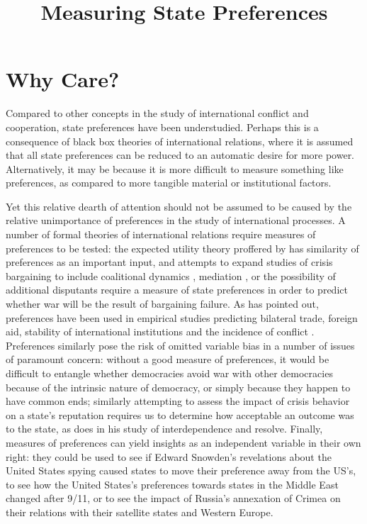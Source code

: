 \documentclass[12pt,onesided,fullpage]{amsart}
\begin{document}
\title{Measuring State Preferences}

\section{Why Care?}
Compared to other concepts in the study of international conflict and cooperation, state preferences have been understudied. Perhaps this is a consequence of black box theories of international relations, where it is assumed that all state preferences can be reduced to an automatic desire for more power. Alternatively, it may be because it is more difficult to measure something like preferences, as compared to more tangible material or institutional factors.

Yet this relative dearth of attention should not be assumed to be caused by the relative unimportance of preferences in the study of international processes. A number of formal theories of international relations require measures of preferences to be tested: the expected utility theory proffered by \citep{WarTrap} has similarity of preferences as an important input, and attempts to expand studies of crisis bargaining to include coalitional dynamics \citep{wolford:2014}, mediation \citep{kydd:year}, or the possibility of additional disputants \citep{gallop:2014} require a measure of state preferences in order to predict whether war will be the result of bargaining failure. As \citet{hage:2011} has pointed out, preferences have been used in empirical studies predicting bilateral trade, foreign aid, stability of international institutions and the incidence of conflict \citep{kastner:2007, derouen:heo:2004, stone:2004, gartzke:2007, braumoeller:2008}. Preferences similarly pose the risk of omitted variable bias in a number of issues of paramount concern: without a good measure of preferences, it would be difficult to entangle whether democracies avoid war with other democracies because of the intrinsic nature of democracy, or simply because they happen to have common ends; similarly attempting to assess the impact of crisis behavior on a state's reputation requires us to determine how acceptable an outcome was to the state, as \citep{crescenzi:200X} does in his study of interdependence and resolve. Finally, measures of preferences can yield insights as an independent variable in their own right: they could be used to see if Edward Snowden's revelations about the United States spying caused states to move their preference away from the US's, to see how the United States's preferences towards states in the Middle East changed after 9/11, or to see the impact of Russia's annexation of Crimea on their relations with their satellite states and Western Europe.
\end{document}
